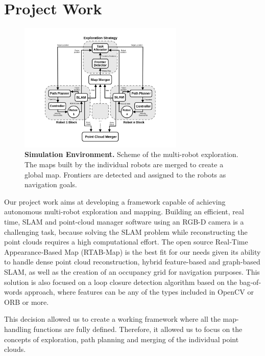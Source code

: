 \section{Project Work}
\label{sec:methods}
\begin{figure}[t]
  \begin{center}
    \includegraphics[width=0.7\textwidth]{img/simulation.png}
  \end{center}
  \caption[]{
    \textbf{Simulation Environment.} 
    Scheme of the multi-robot exploration. The maps built by the individual robots are merged to create a global map. Frontiers are detected and assigned to the robots as navigation goals.
  }
  \label{fig:simulation}
\end{figure}

%
Our project work aims at developing a framework capable of achieving autonomous multi-robot exploration and mapping. Building an efficient, real time, SLAM and point-cloud manager software using an RGB-D camera is a challenging task, because solving the SLAM problem while reconstructing the point clouds requires a high computational effort. The open source Real‐Time Appearance‐Based Map (RTAB-Map) \cite{rtabmap} is the best fit for our needs given its ability to handle dense point cloud reconstruction, hybrid feature-based and graph-based SLAM, as well as the creation of an occupancy grid for navigation purposes. This solution is also focused on a loop closure detection algorithm based on the bag‐of‐words approach, where features can be any of the types included in OpenCV or ORB or more. 

This decision allowed us to create a working framework where all the map-handling functions are fully defined. Therefore, it allowed us to focus on the concepts of exploration, path planning and merging of the individual point clouds. 

